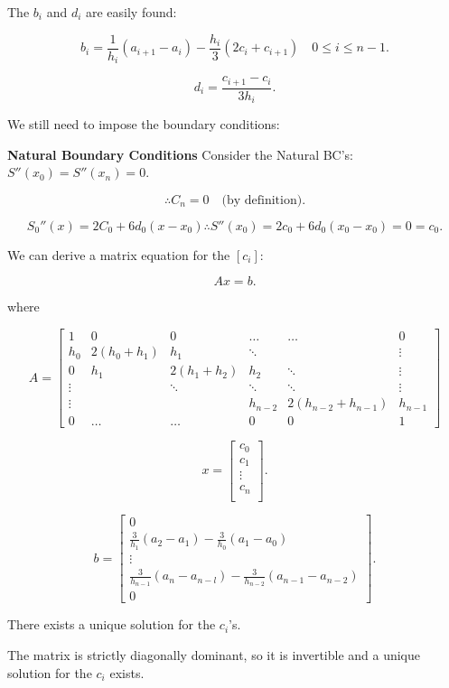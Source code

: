 \documentclass[12pt]{article}
\begin{document}
The $b_i$ and $d_i$ are easily found:

\[
  b_i = \frac{1}{h_i}(a_{i+1} - a_i) - \frac{h_i}{3} (2c_i + c_{i+1}) \quad 0 \leq i \leq n-1
.\]

\[
  d_i = \frac{c_{i+1} - c_i}{3h_i}
.\]

We still need to impose the boundary conditions:

\textbf{Natural Boundary Conditions}
Consider the Natural BC's: $S''(x_0) = S''(x_n) = 0$.

\[
\therefore C_n = 0 \quad\text{(by definition)}
.\]

\[
S_0''(x) = 2C_0 + 6d_0(x-x_0) \therefore S''(x_0) = 2c_0 + 6d_0(x_0-x_0) = 0 =
c_0
.\]

We can derive a matrix equation for the $[c_i]$:

\[
Ax = b
.\]

where 

\[
  A = \begin{bmatrix}
    1 & 0 & 0 & \dots & \dots &  0 \\
    h_0 & 2(h_0+h_1) & h_1 & \ddots & &  \vdots\\
    0 & h_1 & 2(h_1+h_2) & h_2 & \ddots  & \vdots\\
    \vdots & & \ddots & \ddots & \ddots  & \vdots\\
    \vdots & & & h_{n-2} & 2(h_{n-2}+h_{n-1}) & h_{n-1}  \\
    0 & \dots & \dots & 0 & 0 & 1
  \end{bmatrix}
\]

\[
 x=\begin{bmatrix}
 c_0\\
 c_1\\
 \vdots\\
 c_n\\
 \end{bmatrix}
.\]

\[
b=\begin{bmatrix}
0\\
\frac{3}{h_1}(a_2-a_1)-\frac{3}{h_0}(a_1-a_0)\\
\vdots\\
\frac{3}{h_{n-1}}(a_{n}-a_{n-l})-\frac{3}{h_{n-2}}(a_{n-1}-a_{n-2})\\
0
\end{bmatrix}
.\]

There exists a unique solution for the $c_i$'s.

The matrix is strictly diagonally dominant, so it is invertible and a unique
solution for the $c_i$ exists.
\end{document}
